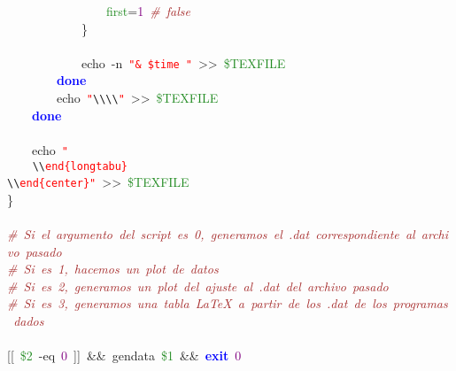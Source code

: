 \mbox{}\ \ \ \ \ \ \ \ \ \ \ \ \ \ \ \ \textcolor{ForestGreen}{first}\textcolor{BrickRed}{=}\textcolor{Purple}{1}\ \textit{\textcolor{Brown}{\#\ false}} \\
\mbox{}\ \ \ \ \ \ \ \ \ \ \ \ \} \\
\mbox{} \\
\mbox{}\ \ \ \ \ \ \ \ \ \ \ \ echo\ -n\ \texttt{\textcolor{Red}{"{}\&\ \$time\ "{}}}\ \textcolor{BrickRed}{\textgreater{}\textgreater{}}\ \textcolor{ForestGreen}{\$TEXFILE} \\
\mbox{}\ \ \ \ \ \ \ \ \textbf{\textcolor{Blue}{done}} \\
\mbox{}\ \ \ \ \ \ \ \ echo\ \texttt{\textcolor{Red}{"{}}}\texttt{\textcolor{CarnationPink}{\textbackslash{}\textbackslash{}\textbackslash{}\textbackslash{}}}\texttt{\textcolor{Red}{"{}}}\ \textcolor{BrickRed}{\textgreater{}\textgreater{}}\ \textcolor{ForestGreen}{\$TEXFILE} \\
\mbox{}\ \ \ \ \textbf{\textcolor{Blue}{done}} \\
\mbox{} \\
\mbox{}\ \ \ \ echo\ \texttt{\textcolor{Red}{"{}}} \\
\mbox{}\texttt{\textcolor{Red}{\ \ \ \ }}\texttt{\textcolor{CarnationPink}{\textbackslash{}\textbackslash{}}}\texttt{\textcolor{Red}{end\{longtabu\}}} \\
\mbox{}\texttt{\textcolor{CarnationPink}{\textbackslash{}\textbackslash{}}}\texttt{\textcolor{Red}{end\{center\}"{}}}\ \textcolor{BrickRed}{\textgreater{}\textgreater{}}\ \textcolor{ForestGreen}{\$TEXFILE} \\
\mbox{}\} \\
\mbox{} \\
\mbox{}\textit{\textcolor{Brown}{\#\ Si\ el\ argumento\ del\ script\ es\ 0,\ generamos\ el\ .dat\ correspondiente\ al\ archivo\ pasado}} \\
\mbox{}\textit{\textcolor{Brown}{\#\ Si\ es\ 1,\ hacemos\ un\ plot\ de\ datos}} \\
\mbox{}\textit{\textcolor{Brown}{\#\ Si\ es\ 2,\ generamos\ un\ plot\ del\ ajuste\ al\ .dat\ del\ archivo\ pasado}} \\
\mbox{}\textit{\textcolor{Brown}{\#\ Si\ es\ 3,\ generamos\ una\ tabla\ LaTeX\ a\ partir\ de\ los\ .dat\ de\ los\ programas\ dados}} \\
\mbox{} \\
\mbox{}\textcolor{BrickRed}{[[}\ \textcolor{ForestGreen}{\$2}\ -eq\ \textcolor{Purple}{0}\ \textcolor{BrickRed}{]]}\ \textcolor{BrickRed}{\&\&}\ gendata\ \textcolor{ForestGreen}{\$1}\ \textcolor{BrickRed}{\&\&}\ \textbf{\textcolor{Blue}{exit}}\ \textcolor{Purple}{0} \\
